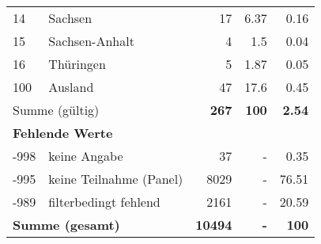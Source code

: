 \begin{longtable}{lXrrr}
     14 &
     \multicolumn{1}{X}{ Sachsen   } &


       \num{17} &
       \num[round-mode=places,round-precision=2]{6,37} &
         \num[round-mode=places,round-precision=2]{0,16} \\

     15 &
     \multicolumn{1}{X}{ Sachsen-Anhalt   } &


       \num{4} &
       \num[round-mode=places,round-precision=2]{1,5} &
         \num[round-mode=places,round-precision=2]{0,04} \\

     16 &
     \multicolumn{1}{X}{ Thüringen   } &


       \num{5} &
       \num[round-mode=places,round-precision=2]{1,87} &
         \num[round-mode=places,round-precision=2]{0,05} \\

     100 &
     \multicolumn{1}{X}{ Ausland   } &


       \num{47} &
       \num[round-mode=places,round-precision=2]{17,6} &
         \num[round-mode=places,round-precision=2]{0,45} \\
     \midrule
     \multicolumn{2}{l}{Summe (gültig)} &
       \textbf{\num{267}} &
     \textbf{100} &
       \textbf{\num[round-mode=places,round-precision=2]{2,54}} \\
     \multicolumn{5}{l}{\textbf{Fehlende Werte}}\\
       -998 &
       keine Angabe &
         \num{37} &
        - &
         \num[round-mode=places,round-precision=2]{0,35} \\
       -995 &
       keine Teilnahme (Panel) &
         \num{8029} &
        - &
         \num[round-mode=places,round-precision=2]{76,51} \\
       -989 &
       filterbedingt fehlend &
         \num{2161} &
        - &
         \num[round-mode=places,round-precision=2]{20,59} \\
     \midrule
     \multicolumn{2}{l}{\textbf{Summe (gesamt)}} &
          \textbf{\num{10494}} &
        \textbf{-} &
        \textbf{100} \\
     \bottomrule
     \end{longtable}
     
